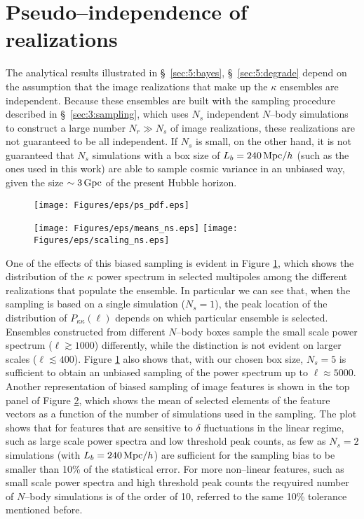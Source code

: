 \section{Pseudo--independence of realizations}
The analytical results illustrated in \S~\ref{sec:5:bayes}, \S~\ref{sec:5:degrade} depend on the assumption that the image realizations that make up the $\kappa$ ensembles are independent. Because these ensembles are built with the sampling procedure described in \S~\ref{sec:3:sampling}, which uses $N_s$ independent $N$--body simulations to construct a large number $N_r\gg N_s$ of image realizations, these realizations are not guaranteed to be all independent. If $N_s$ is small, on the other hand, it is not guaranteed that $N_s$ simulations with a box size of $L_b=240\,{\rm Mpc}/h$ (such as the ones used in this work) are able to sample cosmic variance in an unbiased way, given the size $\sim 3\,{\rm Gpc}$ of the present Hubble horizon. 
%
\begin{figure}
\begin{center}
\texttt{[image: Figures/eps/ps\_pdf.eps]}
\end{center}
\caption{}
\label{fig:5:pspdf}
\end{figure}
%
\begin{figure}
\begin{center}
\texttt{[image: Figures/eps/means\_ns.eps]} \texttt{[image: Figures/eps/scaling\_ns.eps]}
\end{center}
\caption{}
\label{fig:5:mcns}
\end{figure}
%
One of the effects of this biased sampling is evident in Figure \ref{fig:5:pspdf}, which shows the distribution of the $\kappa$ power spectrum in selected multipoles among the different realizations that populate the ensemble. In particular we can see that, when the sampling is based on a single simulation ($N_s=1$), the peak location of the distribution of $P_{\kappa\kappa}(\ell)$ depends on which particular ensemble is selected. Ensembles constructed from different $N$--body boxes sample the small scale power spectrum ($\ell\gtrsim 1000$) differently, while the distinction is not evident on larger scales ($\ell\lesssim 400$). Figure \ref{fig:5:pspdf} also shows that, with our chosen box size, $N_s=5$ is sufficient to obtain an unbiased sampling of the power spectrum up to $\ell\approx5000$. Another representation of biased sampling of image features is shown in the top panel of Figure \ref{fig:5:mcns}, which shows the mean of selected elements of the feature vectors as a function of the number of simulations used in the sampling. The plot shows that for features that are sensitive to $\delta$ fluctuations in the linear regime, such as large scale power spectra and low threshold peak counts, as few as $N_s=2$ simulations (with $L_b=240\,{\rm Mpc}/h$) are sufficient for the sampling bias to be smaller than 10\% of the statistical error. For more non--linear features, such as small scale power spectra and high threshold peak counts the reqyuired number of $N$--body simulations is of the order of 10, referred to the same 10\% tolerance mentioned before.    
